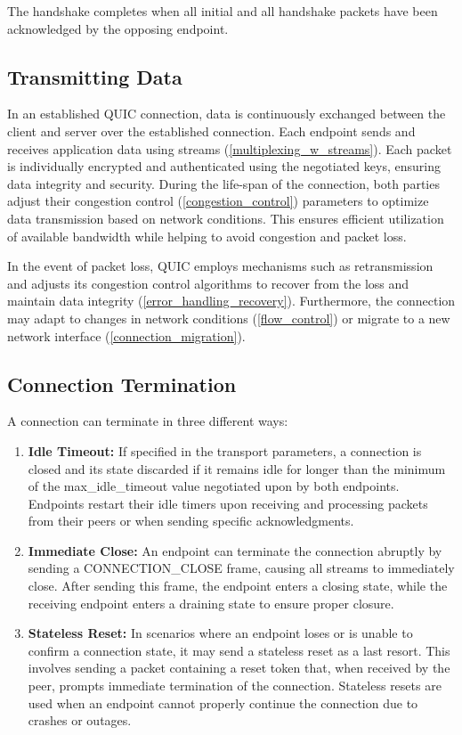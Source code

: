 The handshake completes when all initial and all handshake packets have been acknowledged by the opposing endpoint.

\subsection{Transmitting Data}

In an established QUIC connection, data is continuously exchanged between the client and server over the established connection.
Each endpoint sends and receives application data using streams (\ref{multiplexing_w_streams}). Each packet is individually encrypted
and authenticated using the negotiated keys, ensuring data integrity and security. During the life-span of the connection, both
parties adjust their congestion control (\ref{congestion_control}) parameters to optimize data transmission based on network conditions.
This ensures efficient utilization of available bandwidth while helping to avoid congestion and packet loss.

In the event of packet loss, QUIC employs mechanisms such as retransmission and adjusts its congestion control algorithms to
recover from the loss and maintain data integrity (\ref{error_handling_recovery}). Furthermore, the connection may adapt to changes
in network conditions (\ref{flow_control}) or migrate to a new network interface (\ref{connection_migration}).

\subsection{Connection Termination}

A connection can terminate in three different ways:

\begingroup
\renewcommand\labelenumi{(\theenumi)}
\begin{enumerate}
\item \textbf{Idle Timeout:} If specified in the transport parameters, a connection is closed and its state discarded if it remains
idle for longer than the minimum of the max\_idle\_timeout value negotiated upon by both endpoints. Endpoints restart their idle timers
upon receiving and processing packets from their peers or when sending specific acknowledgments. \cite[57]{rfc9000} \label{idle_timeout}
\item \textbf{Immediate Close:} An endpoint can terminate the connection abruptly by sending a CONNECTION\_CLOSE frame, causing all streams to immediately close. After sending this frame, the endpoint enters a closing state, while the receiving endpoint enters a draining state to ensure proper closure. \cite[58]{rfc9000} \label{immediate_close}
\item \textbf{Stateless Reset:} In scenarios where an endpoint loses or is unable to confirm a connection state, it may send a
stateless reset as a last resort. This involves sending a packet containing a reset token that, when received by the peer,
prompts immediate termination of the connection. Stateless resets are used when an endpoint cannot properly continue the connection
due to crashes or outages. \cite[61]{rfc9000} \label{stateless_reset}
\end{enumerate}
\endgroup

